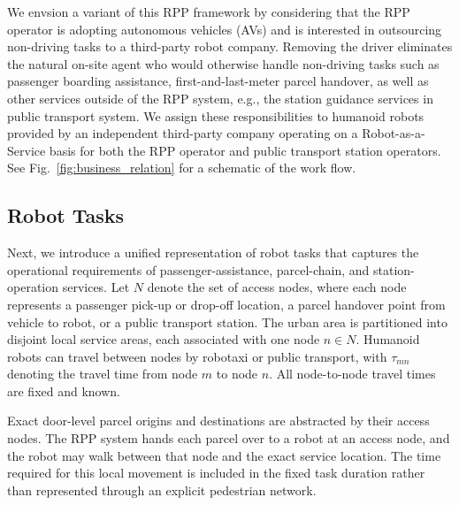 \documentclass[11pt,oneside]{article}
\begin{document}
We envsion a variant of this RPP framework by considering that the RPP operator is adopting autonomous vehicles (AVs) and is interested in outsourcing non-driving tasks to a third-party robot company.  Removing the driver
eliminates the natural on-site agent who would otherwise handle non-driving
tasks such as passenger boarding assistance, first-and-last-meter parcel
handover, as well as other services outside of the RPP system, e.g., the  station guidance services in public transport system. We assign these responsibilities to humanoid
robots provided by an independent third-party company operating on a
Robot-as-a-Service basis for both the RPP operator and public transport
station operators. See Fig.~\ref{fig:business_relation} for a schematic of the work flow.



\subsection{Robot Tasks}
\label{subsec:task_information}

Next, we introduce a unified representation of robot tasks that captures the operational requirements of passenger-assistance, parcel-chain, and station-operation services. Let \(N\)
denote the set of access nodes, where each node represents a passenger pick-up or drop-off location, a parcel handover point from vehicle to robot, or a public transport station. The urban area is partitioned into disjoint local service areas, each
associated with one node \(n\in N\). Humanoid robots can travel between nodes by robotaxi or public
transport, with \(\tau_{mn}\) denoting the travel time from node \(m\) to node
\(n\). All node-to-node travel times are fixed and known.


Exact door-level parcel origins and destinations are abstracted by their access
nodes. The RPP system hands each parcel over to a robot at an access node, and
the robot may walk between that node and the exact service location. The time
required for this local movement is included in the fixed task duration rather
than represented through an explicit pedestrian network.
\end{document}
